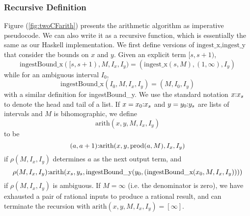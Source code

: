 \documentclass[11pt, oneside]{amsart}   	%
\renewcommand{\:}{\negthickspace:\negthickspace}
\begin{document}
\subsubsection{Recursive Definition}
Figure (\ref{fig:twoCFarith}) presents the arithmetic algorithm as imperative pseudocode. We can also write it as a recursive function,
which is essentially the same as our Haskell implementation.
We first define versions of $\mbox{ingest\_x},\mbox{ingest\_y}$ that consider the bounds on $x$ and $y$. Given an explicit term $[s,s+1)$,
\[
\mbox{ingestBound\_x}([s,s+1), M, I_x, I_y) = 
(\mbox{ingest\_x}(s,M), (1,\infty),I_y)
\]
while for an ambiguous interval $I_0$,
\[
\mbox{ingestBound\_x}(I_0, M, I_x, I_y) = 
(M, I_0,I_y)
\]
with a similar definition for \mbox{ingestBound\_y}.
We use the standard notation $x\:x_s$ to denote the head and tail of a list. 
If $x = x_0\:x_s$ and $y = y_0\:y_s$ are lists of intervals and $M$ is bihomographic, we define
\[
\mbox{arith}(x,y, M, I_x, I_y)
\]
to be
\[
(a,a+1)\:\mbox{arith}(x,y,  \mbox{prod}(a,M) ,  I_x,  I_y)
\]
if $\rho(M,I_x,I_y)$ determines $a$ as the next output term, and
\[
\rho(M,I_x,I_y)\:\mbox{arith}(x_s,y_s,  \mbox{ingestBound\_y}( y_0, (\mbox{ingestBound\_x}(x_0,M,I_x,I_y)) ))
\]
if $\rho(M,I_x,I_y)$ is ambiguous. If $M=\infty$ (i.e. the denominator is zero), we have exhausted a pair of rational inputs to produce a rational result, and can terminate the recursion with $\mbox{arith}(x,y, M, I_x, I_y) = [\infty]$.

\end{document}
